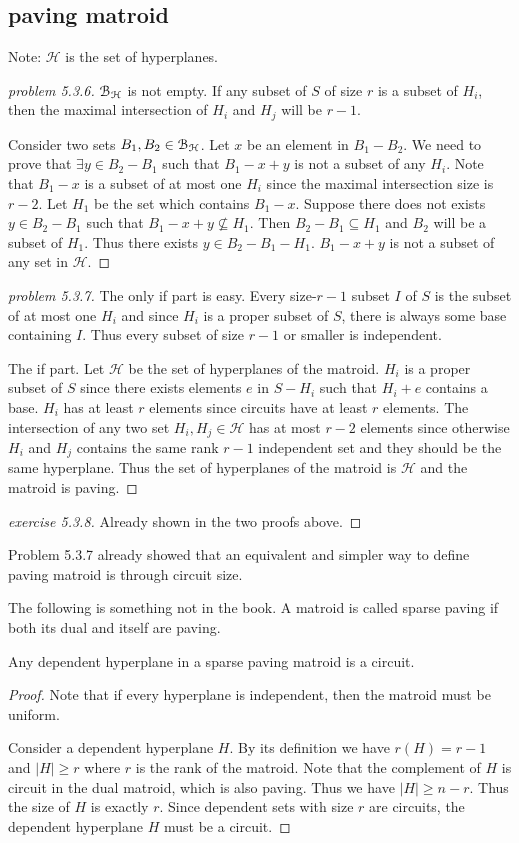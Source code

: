 \subsection{paving matroid}
Note: $\mathcal H$ is the set of hyperplanes.
\begin{proof}[problem 5.3.6]
    $\mathcal{B}_{\mathcal H}$ is not empty. If any subset of $S$ of size $r$ is a subset of $H_i$, then the maximal intersection of $H_i$ and $H_j$ will be $r-1$.

    Consider two sets $B_1,B_2\in\mathcal{B}_{\mathcal H}$. Let $x$ be an element in $B_1-B_2$. We need to prove that $\exists y\in B_2-B_1$ such that $B_1-x+y$ is not a subset of any $H_i$. Note that $B_1-x$ is a subset of at most one $H_i$ since the maximal intersection size is $r-2$. Let $H_1$ be the set which contains $B_1-x$. Suppose there does not exists $y\in B_2-B_1$ such that $B_1-x+y\not\subseteq H_1$. Then $B_2-B_1\subseteq H_1$ and $B_2$ will be a subset of $H_1$. Thus there exists $y\in B_2-B_1-H_1$. $B_1-x+y$ is not a subset of any set in $\mathcal{H}$.
\end{proof}
\begin{proof}[problem 5.3.7]
    The only if part is easy. Every size-$r-1$ subset $I$ of $S$ is the subset of at most one $H_i$ and since $H_i$ is a proper subset of $S$, there is always some base containing $I$. Thus every subset of size $r-1$ or smaller is independent.
    
    The if part. Let $\mathcal{H}$ be the set of hyperplanes of the matroid. $H_i$ is a proper subset of $S$ since there exists elements $e$ in $S-H_i$ such that $H_i+e$ contains a base. $H_i$ has at least $r$ elements since circuits have at least $r$ elements. The intersection of any two set $H_i,H_j\in \mathcal{H}$ has at most $r-2$ elements since otherwise $H_i$ and $H_j$ contains the same rank $r-1$ independent set and they should be the same hyperplane. Thus the set of hyperplanes of the matroid is $\mathcal{H}$ and the matroid is paving.
\end{proof}
\begin{proof}[exercise 5.3.8]
    Already shown in the two proofs above.
\end{proof}

Problem 5.3.7 already showed that an equivalent and simpler way to define paving matroid is through circuit size.

The following is something not in the book. A matroid is called sparse paving if both its dual and itself are paving.

\begin{lemma}
    Any dependent hyperplane in a sparse paving matroid is a circuit.
\end{lemma}
\begin{proof}
    Note that if every hyperplane is independent, then the matroid must be uniform.

    Consider a dependent hyperplane $H$. By its definition we have $r(H)=r-1$ and $|H|\geq r$ where $r$ is the rank of the matroid. Note that the complement of $H$ is circuit in the dual matroid, which is also paving. Thus we have $|H|\geq n-r$. Thus the size of $H$ is exactly $r$. Since dependent sets with size $r$ are circuits, the dependent hyperplane $H$ must be a circuit.
\end{proof}

